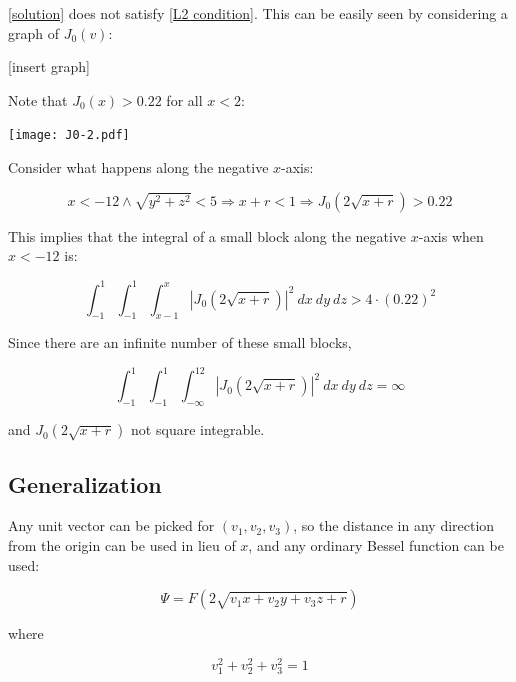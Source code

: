 \documentclass{article}
\begin{document}
\eqref{solution} does not satisfy \eqref{L2 condition}.  This can be easily seen by considering a graph
of $J_0(v)$:

[insert graph]

Note that $J_0(x) > 0.22$ for all $x<2$:

\texttt{[image: J0-2.pdf]}

Consider what happens along the negative $x$-axis: \qquad
{}

\[ x<-12 \land \sqrt{y^2+z^2} < 5 \Longrightarrow x+r < 1 \Longrightarrow J_0(2\sqrt{x+r}) > 0.22 \]

This implies that the integral of a small block along the negative $x$-axis when $x<-12$ is:

\[ \int_{-1}^{1} \int_{-1}^{1} \int_{x-1}^{x} \left|J_0(2\sqrt{x+r})\right|^2\ dx\ dy\ dz  > 4 \cdot (0.22)^2 \]

Since there are an infinite number of these small blocks,

\[ \int_{-1}^{1} \int_{-1}^{1} \int_{-\infty}^{12} \left|J_0(2\sqrt{x+r})\right|^2\ dx\ dy\ dz  = \infty \]

and $J_0(2\sqrt{x+r})$ not square integrable.

\subsection*{Generalization}
\parskip 12pt

Any unit vector can be picked for $(v_1, v_2, v_3)$,
so the distance in any direction from the origin can be used in lieu of $x$,
and any ordinary Bessel function can be used:

\begin{equation}
\label{generalized solution}
\Psi = F(2\sqrt{v_1 x+ v_2 y+ v_3 z+r})
\end{equation}

where

\begin{equation*}
v_1^2+v_2^2+v_3^2=1
\end{equation*}
\end{document}
